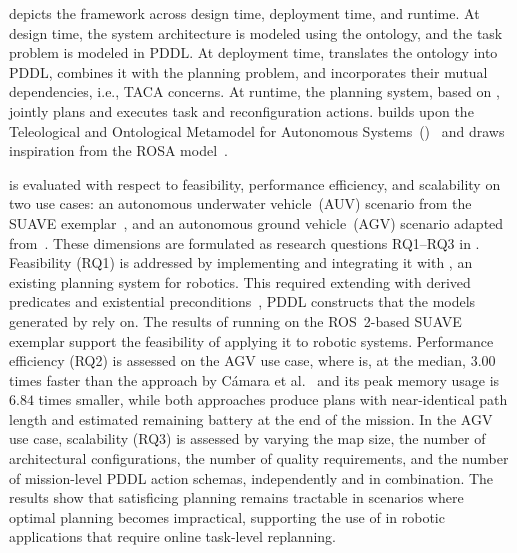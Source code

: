  depicts the \planta framework across design time, deployment time, and runtime. At design time, the system architecture is modeled using the \pddltomasys ontology, and the task problem is modeled in PDDL\@. At deployment time, \owltopddl translates the ontology into PDDL, combines it with the planning problem, and incorporates their mutual dependencies, i.e., TACA concerns. At runtime, the planning system, based on \plansys, jointly plans and executes task and reconfiguration actions. \pddltomasys builds upon the Teleological and Ontological Metamodel for Autonomous Systems~(\tomasys)~\cite{aguado2021functional,corbato2013model} and draws inspiration from the ROSA model~\cite{rosa}. %

\planta is evaluated with respect to feasibility, performance efficiency, and scalability on two use cases: an autonomous underwater vehicle~(AUV) scenario from the SUAVE exemplar~\cite{suave}, and an autonomous ground vehicle~(AGV) scenario adapted from~\cite{CAMARASoftwareArchitectureTask2020}. These dimensions are formulated as research questions RQ1--RQ3 in .
Feasibility (RQ1) is addressed by implementing \planta and integrating it with \plansys, an existing planning system for robotics. This required extending \plansys with derived predicates and existential preconditions~\cite{edelkamp2004pddl2}, PDDL constructs that the models generated by \owltopddl rely on.
The results of running \planta on the ROS~2-based SUAVE exemplar support the feasibility of applying it to robotic systems.
Performance efficiency (RQ2) is assessed on the AGV use case, where \planta is, at the median, $3.00$ times faster than the approach by Cámara et al.~\cite{CAMARASoftwareArchitectureTask2020} and its peak memory usage is $6.84$ times smaller, while both approaches produce plans with near-identical path length and estimated remaining battery at the end of the mission.
In the AGV use case, scalability (RQ3) is assessed by varying the map size, the number of architectural configurations, the number of quality requirements, and the number of mission-level PDDL action schemas, independently and in combination. The results show that satisficing planning remains tractable in scenarios where optimal planning becomes impractical, supporting the use of \planta in robotic applications that require online task-level replanning.

